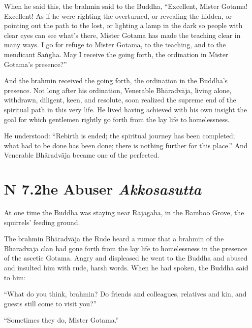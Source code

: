 \documentclass[12pt,openany]{book}%
\newcommand*{\suttatitleacronym}[1]{\smaller[2]{#1}\vspace*{.3em}}
\newcommand*{\suttatitletranslation}[1]{\linebreak{#1}}
\newcommand*{\suttatitleroot}[1]{\linebreak\smaller[2]\itshape{#1}}
\newcommand*{\tocacronym}[1]{\hspace*{-3.3em}{#1}\quad}
\newcommand*{\toctranslation}[1]{#1}
\newcommand*{\tocroot}[1]{(\textit{#1})}
\begin{document}
When he said this, the brahmin said to the Buddha, “Excellent, Mister Gotama! Excellent! As if he were righting the overturned, or revealing the hidden, or pointing out the path to the lost, or lighting a lamp in the dark so people with clear eyes can see what’s there, Mister Gotama has made the teaching clear in many ways. I go for refuge to Mister Gotama, to the teaching, and to the mendicant \textsanskrit{Saṅgha}. May I receive the going forth, the ordination in Mister Gotama’s presence?” 

And the brahmin received the going forth, the ordination in the Buddha’s presence. Not long after his ordination, Venerable \textsanskrit{Bhāradvāja}, living alone, withdrawn, diligent, keen, and resolute, soon realized the supreme end of the spiritual path in this very life. He lived having achieved with his own insight the goal for which gentlemen rightly go forth from the lay life to homelessness. 

He understood: “Rebirth is ended; the spiritual journey has been completed; what had to be done has been done; there is nothing further for this place.” And Venerable \textsanskrit{Bhāradvāja} became one of the perfected. 

%
\section*{{\suttatitleacronym SN 7.2}{\suttatitletranslation The Abuser }{\suttatitleroot Akkosasutta}}
\addcontentsline{toc}{section}{\tocacronym{SN 7.2} \toctranslation{The Abuser } \tocroot{Akkosasutta}}

At one time the Buddha was staying near \textsanskrit{Rājagaha}, in the Bamboo Grove, the squirrels’ feeding ground. 

The brahmin \textsanskrit{Bhāradvāja} the Rude heard a rumor that a brahmin of the \textsanskrit{Bhāradvāja} clan had gone forth from the lay life to homelessness in the presence of the ascetic Gotama. Angry and displeased he went to the Buddha and abused and insulted him with rude, harsh words. When he had spoken, the Buddha said to him: 

“What do you think, brahmin? Do friends and colleagues, relatives and kin, and guests still come to visit you?” 

“Sometimes they do, Mister Gotama.” 
\end{document}
